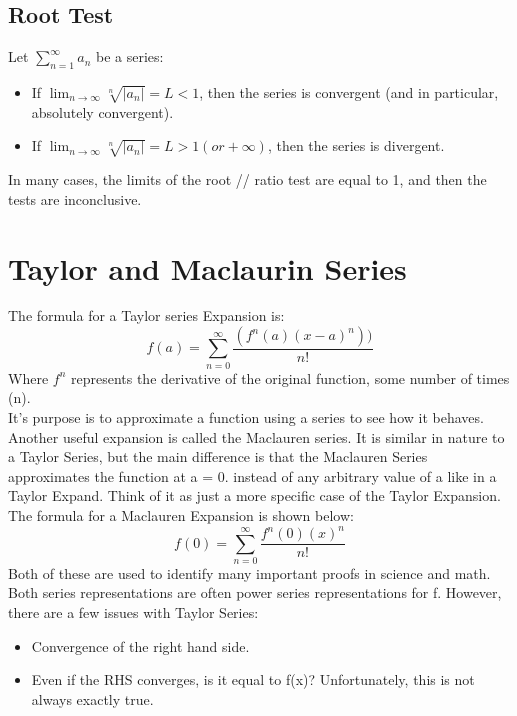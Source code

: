 \documentclass[12pt, letterpaper]{article}
\begin{document}
        \subsection{Root Test}
            Let $\sum_{n = 1}^\infty a_n$ be a series:
            \begin{itemize}
                \item If $\lim_{n \to \infty} \sqrt[n]{ |a_n| } = L < 1$, then the series is convergent (and in particular, absolutely convergent).
                \item If $\lim_{n \to \infty} \sqrt[n]{ |a_n| } = L > 1 (or +\infty)$, then the series is divergent.
            \end{itemize}
            In many cases, the limits of the root // ratio test are equal to 1, and then the tests are inconclusive.
    \section{Taylor and Maclaurin Series}
            The formula for a Taylor series Expansion is:
            \begin{equation*}
                f(a) = \sum_{n=0}^{\infty} \frac{(f^n (a)(x-a)^n))}{n!}
            \end{equation*}
            Where $f^n$ represents the derivative of the original function, some number of times (n).\\
            It's purpose is to approximate a function using a series to see how it behaves. Another useful expansion is called the Maclauren series. It is similar in nature
            to a Taylor Series, but the main difference is that the Maclauren Series approximates the function at a = 0. instead of any arbitrary value of a like in a Taylor Expand. 
            Think of it as just a more specific case of the Taylor Expansion. The formula for a Maclauren Expansion is shown below:
            \begin{equation*}
                f(0) = \sum^{\infty}_{n=0} \frac{f^n(0)(x)^n}{n!}
            \end{equation*}
            Both of these are used to identify many important proofs in science and math. Both series representations are often power series representations for f. However, there  are
            a few issues with Taylor Series:
            \begin{center}
                \begin{itemize}
                    \item Convergence of the right hand side. 
                    \item Even if the RHS converges, is it equal to f(x)? Unfortunately, this is not always exactly true.
                \end{itemize}
            \end{center}
\end{document}
